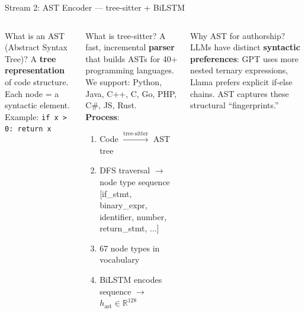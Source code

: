 \documentclass[aspectratio=169, 10pt]{beamer}
\begin{document}
\begin{frame}{Stream 2: AST Encoder --- tree-sitter + BiLSTM}
\vspace{-0.15cm}
\begin{columns}[T]
\begin{block}{What is an AST (Abstract Syntax Tree)?}
\small
A \textbf{tree representation} of code structure. Each node = a syntactic element.\\[4pt]
Example: \texttt{if x > 0: return x}\\[2pt]
\end{block}

\begin{block}{What is tree-sitter?}
\small
A fast, incremental \textbf{parser} that builds ASTs for 40+ programming languages. We support: Python, Java, C++, C, Go, PHP, C\#, JS, Rust.\\[4pt]
\textbf{Process}:
\begin{enumerate}\setlength\itemsep{1pt}
    \item[\faCode] Code $\xrightarrow{\text{tree-sitter}}$ AST tree
    \item[\faList] DFS traversal $\to$ node type sequence\\
    {\scriptsize [if\_stmt, binary\_expr, identifier, number, return\_stmt, ...]}
    \item[\faCogs] 67 node types in vocabulary
    \item[\faArrowRight] BiLSTM encodes sequence $\to$ $h_{\text{ast}} \in \mathbb{R}^{128}$
\end{enumerate}
\end{block}

\begin{exampleblock}{\scriptsize Why AST for authorship?}
\scriptsize
LLMs have distinct \textbf{syntactic preferences}: GPT uses more nested ternary expressions, Llama prefers explicit if-else chains. AST captures these structural ``fingerprints.''
\end{exampleblock}
\end{columns}
\end{frame}
\end{document}
